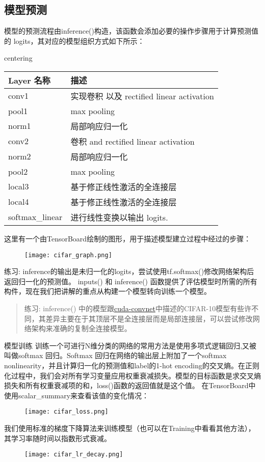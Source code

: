 {\subsection{模型预测}
模型的预测流程由inference()构造，该函数会添加必要的操作步骤用于计算预测值的 logits，其对应的模型组织方式如下所示：
\begin{table}[!h]
centering
\begin{tabular}{|p{2cm}|p{8cm}|}
\hline
Layer 名称&描述\\
\hline
conv1&实现卷积 以及 rectified linear activation\\
\hline
pool1&max pooling\\
\hline
norm1&局部响应归一化\\
\hline
conv2&卷积 and rectified linear activation\\
\hline
norm2&局部响应归一化\\
\hline
pool2&max pooling\\
\hline
local3&基于修正线性激活的全连接层\\
\hline
local4&基于修正线性激活的全连接层\\
\hline
softmax\_linear&进行线性变换以输出 logits.
\hline
\end{tabular}
\end{table}
这里有一个由TensorBoard绘制的图形，用于描述模型建立过程中经过的步骤：
\begin{figure}[H]
\centering
\texttt{[image: cifar\_graph.png]}
\end{figure}
练习: inference的输出是未归一化的logits，尝试使用tf.softmax()修改网络架构后返回归一化的预测值。
inputs() 和 inference() 函数提供了评估模型时所需的所有构件，现在我们把讲解的重点从构建一个模型转向训练一个模型。
\begin{quote}
练习: inference() 中的模型跟\href{https://code.google.com/p/cuda-convnet/}{cuda-convnet}中描述的CIFAR-10模型有些许不同，其差异主要在于其顶层不是全连接层而是局部连接层，可以尝试修改网络架构来准确的复制全连接模型。
\end{quote}
模型训练
训练一个可进行N维分类的网络的常用方法是使用多项式逻辑回归,又被叫做softmax 回归。Softmax 回归在网络的输出层上附加了一个softmax nonlinearity，并且计算归一化的预测值和label的1-hot encoding的交叉熵。在正则化过程中，我们会对所有学习变量应用权重衰减损失。模型的目标函数是求交叉熵损失和所有权重衰减项的和，loss()函数的返回值就是这个值。
在TensorBoard中使用scalar\_summary来查看该值的变化情况：
\begin{figure}[H]
\centering
\texttt{[image: cifar\_loss.png]}
\end{figure}
我们使用标准的梯度下降算法来训练模型（也可以在Training中看看其他方法），其学习率随时间以指数形式衰减。
\begin{figure}[H]
\centering
\texttt{[image: cifar\_lr\_decay.png]}
\end{figure}
}
